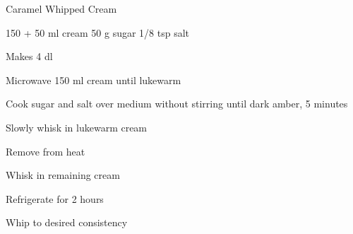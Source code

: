 \begin{recipe}{Caramel Whipped Cream}{\vegetarian{}}
\begin{ingredients}
150 + 50 ml cream
50 g sugar
1/8 tsp salt
\end{ingredients}
\nextcolumn
Makes 4 dl
\begin{steps}
    \item Microwave 150 ml cream until lukewarm
    \item Cook sugar and salt over medium without stirring until dark amber, 5 minutes
    \item Slowly whisk in lukewarm cream
    \item Remove from heat
    \item Whisk in remaining cream
    \item Refrigerate for 2 hours
    \item Whip to desired consistency
\end{steps}
\end{recipe}
